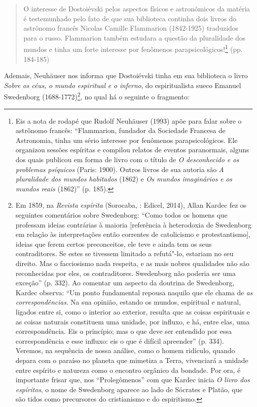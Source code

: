 \begin{quote}
O interesse de Dostoiévski pelos aspectos físicos e astronômicos da
matéria é testemunhado pelo fato de que sua biblioteca continha dois
livros do astrônomo francês Nicolas Camille Flammarion (1842-1925)
traduzidos para o russo. Flammarion também estudara a questão da
pluralidade dos mundos e tinha um forte interesse por fenômenos
parapsicológicos!\footnote{Eis a nota de rodapé que Rudolf Neuhäuser
  (1993) apõe para falar sobre o astrônomo francês: ``Flammarion,
  fundador da Sociedade Francesa de Astronomia, tinha um sério interesse
  por fenômenos parapsicológicos. Ele organizou sessões espíritas e
  compilou relatos de eventos paranormais, alguns dos quais publicou em
  forma de livro com o título de \emph{O desconhecido e os problemas
  psíquicos} (Paris: 1900). Outros livros de sua autoria são \emph{A
  pluralidade dos mundos habitados} (1862) e \emph{Os mundos imaginários
  e os mundos reais} (1862)'' (p. 185).} (pp. 184-185)
\end{quote}

Ademais, Neuhäuser nos informa que Dostoiévski tinha em sua biblioteca o
livro \emph{Sobre os céus, o mundo espiritual e o inferno}, do
espiritualista sueco Emanuel Swedenborg (1688-1772)\footnote{Em 1859, na
  \emph{Revista espírita} (Sorocaba, : Edicel, 2014), Allan Kardec fez
  os seguintes comentários sobre Swedenborg: ``Como todos os homens que
  professam ideias contrárias à maioria {[}referência à heterodoxia de
  Swedenborg em relação às interpretações então correntes de catolicismo
  e protestantismo{]}, ideias que ferem certos preconceitos, ele teve e
  ainda tem os seus contraditores. Se estes se tivessem limitado a
  refutá"-lo, estariam no seu direito. Mas o facciosismo nada respeita, e
  as mais nobres qualidades não são reconhecidas por eles, os
  contraditores. Swedenborg não poderia ser uma exceção'' (p. 332). Ao
  comentar um aspecto da doutrina de Swedenborg, Kardec observa: ``Um
  ponto fundamental repousa naquilo que ele chama de \emph{as
  correspondências}. Na sua opinião, estando os mundos, espiritual e
  natural, ligados entre si, como o interior ao exterior, resulta que as
  coisas espirituais e as coisas naturais constituem uma unidade, por
  influxo, e há, entre elas, uma correspondência. Eis o princípio; mas o
  que deve ser entendido por essa correspondência e esse influxo: eis o
  que é difícil apreender'' (p. 334). Veremos, na sequência de nossa
  análise, como o homem ridículo, quando depara com o paraíso no planeta
  que mimetiza a Terra, vivenciará a unidade entre espírito e natureza
  como o encontro orgânico da bondade. Por ora, é importante frisar que,
  nos ``Prolegômenos'' com que Kardec inicia \emph{O livro dos
  espíritos}, o nome de Swedenborg aparece ao lado de Sócrates e Platão,
  que são tidos como precursores do cristianismo e do espiritismo.}, no
qual há o seguinte o fragmento:

